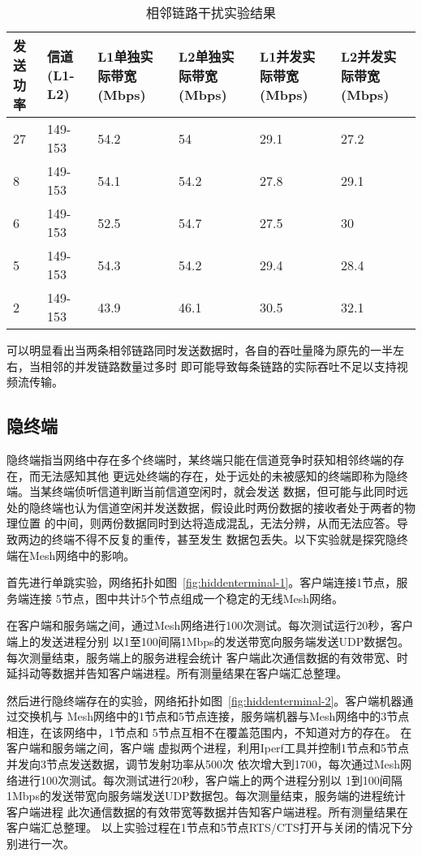 \begin{table}[htbp]
  \centering
  \caption{相邻链路干扰实验结果}
  \label{tab:interference}
  \begin{tabular}{p{2cm}p{2cm}p{2cm}p{2cm}p{2cm}p{2cm}}
  \hline
  发送功率 & 信道(L1-L2) & L1单独实际带宽(Mbps) & L2单独实际带宽(Mbps) & L1并发实际带宽(Mbps) & L2并发实际带宽(Mbps) \\
  \hline
  27 &  149-153 & 54.2 & 54 & 29.1 & 27.2 \\
  8 &  149-153 & 54.1 & 54.2 & 27.8 & 29.1 \\
  6 &  149-153 & 52.5 & 54.7 & 27.5 & 30 \\
  5 &  149-153 & 54.3 & 54.2 & 29.4 & 28.4 \\
  2 &  149-153 & 43.9 & 46.1 & 30.5 & 32.1 \\
  \hline
  \end{tabular}
\end{table}

可以明显看出当两条相邻链路同时发送数据时，各自的吞吐量降为原先的一半左右，当相邻的并发链路数量过多时
即可能导致每条链路的实际吞吐不足以支持视频流传输。

\subsection{隐终端}
隐终端指当网络中存在多个终端时，某终端只能在信道竞争时获知相邻终端的存在，而无法感知其他
更远处终端的存在，处于远处的未被感知的终端即称为隐终端。当某终端侦听信道判断当前信道空闲时，就会发送
数据，但可能与此同时远处的隐终端也认为信道空闲并发送数据，假设此时两份数据的接收者处于两者的物理位置
的中间，则两份数据同时到达将造成混乱，无法分辨，从而无法应答。导致两边的终端不得不反复的重传，甚至发生
数据包丢失。以下实验就是探究隐终端在Mesh网络中的影响。

首先进行单跳实验，网络拓扑如图~\ref{fig:hiddenterminal-1}。客户端连接1节点，服务端连接
5节点，图中共计5个节点组成一个稳定的无线Mesh网络。

在客户端和服务端之间，通过Mesh网络进行100次测试。每次测试运行20秒，客户端上的发送进程分别
以1至100间隔1Mbps的发送带宽向服务端发送UDP数据包。每次测量结束，服务端上的服务进程会统计
客户端此次通信数据的有效带宽、时延抖动等数据并告知客户端进程。所有测量结果在客户端汇总整理。

然后进行隐终端存在的实验，网络拓扑如图~\ref{fig:hiddenterminal-2}。客户端机器通过交换机与
Mesh网络中的1节点和5节点连接，服务端机器与Mesh网络中的3节点相连，在该网络中，1节点和
5节点互相不在覆盖范围内，不知道对方的存在。
在客户端和服务端之间，客户端
虚拟两个进程，利用Iperf工具并控制1节点和5节点并发向3节点发送数据，调节发射功率从500次
依次增大到1700，每次通过Mesh网络进行100次测试。每次测试进行20秒，客户端上的两个进程分别以
1到100间隔1Mbps的发送带宽向服务端发送UDP数据包。每次测量结束，服务端的进程统计客户端进程
此次通信数据的有效带宽等数据并告知客户端进程。所有测量结果在客户端汇总整理。
以上实验过程在1节点和5节点RTS/CTS打开与关闭的情况下分别进行一次。

